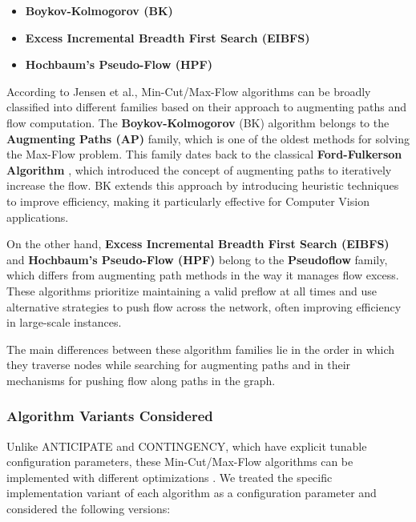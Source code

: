 \documentclass[a4paper,singleside,12pt]{report} %
\begin{document}
\begin{itemize}
    \item \textbf{Boykov-Kolmogorov (BK)}
    \item \textbf{Excess Incremental Breadth First Search (EIBFS)}
    \item \textbf{Hochbaum's Pseudo-Flow (HPF)}
\end{itemize}

According to Jensen et al., Min-Cut/Max-Flow algorithms can be broadly classified into different families based on their approach 
to augmenting paths and flow computation. The \textbf{Boykov-Kolmogorov} (BK) algorithm \cite{bk2004maxflow} belongs to the \textbf{Augmenting Paths 
(AP)} family, which is one of the oldest methods for solving the Max-Flow problem. This family dates back to the classical 
\textbf{Ford-Fulkerson Algorithm} \cite{ford1956maxflow}, which introduced the concept of augmenting paths to iteratively 
increase the flow. BK extends this approach by introducing heuristic techniques to improve efficiency, making it particularly 
effective for Computer Vision applications.

On the other hand, \textbf{Excess Incremental Breadth First Search (EIBFS)} \cite{goldberg2015faster} and \textbf{Hochbaum’s 
Pseudo-Flow (HPF)} \cite{hochbaum2008pseudoflow} belong to the \textbf{Pseudoflow} family, which differs from augmenting path 
methods in the way it manages flow excess. These algorithms prioritize maintaining a valid preflow at all times and use alternative 
strategies to push flow across the network, often improving efficiency in large-scale instances. 

The main differences between these algorithm families lie in the order in which they traverse nodes while searching for augmenting 
paths and in their mechanisms for pushing flow along paths in the graph.

\subsubsection{Algorithm Variants Considered}

Unlike ANTICIPATE and CONTINGENCY, which have explicit tunable configuration parameters, these Min-Cut/Max-Flow algorithms can 
be implemented with different optimizations \cite{Jensen2023Maxflow}. We treated the specific implementation variant of each algorithm as a configuration 
parameter and considered the following versions:
\end{document}

